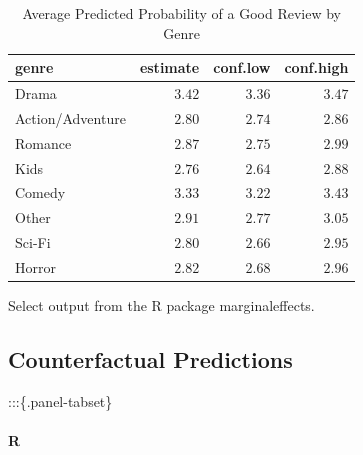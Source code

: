 \documentclass[
  letterpaper,
]{krantz}
\let\oldparagraph\paragraph
\renewcommand{\paragraph}[1]{\oldparagraph{#1}\mbox{}}
\begin{document}
\begin{longtable}{lrrr}

\caption{\label{tbl-marginal-means-genre}Average Predicted Probability
of a Good Review by Genre}

\tabularnewline

\toprule
genre & estimate & conf.low & conf.high \\ 
\midrule\addlinespace[2.5pt]
Drama & \textcolor[HTML]{404040}{$3.42$} & \textcolor[HTML]{404040}{$3.36$} & \textcolor[HTML]{404040}{$3.47$} \\ 
Action/Adventure & \textcolor[HTML]{404040}{$2.80$} & \textcolor[HTML]{404040}{$2.74$} & \textcolor[HTML]{404040}{$2.86$} \\ 
Romance & \textcolor[HTML]{404040}{$2.87$} & \textcolor[HTML]{404040}{$2.75$} & \textcolor[HTML]{404040}{$2.99$} \\ 
Kids & \textcolor[HTML]{404040}{$2.76$} & \textcolor[HTML]{404040}{$2.64$} & \textcolor[HTML]{404040}{$2.88$} \\ 
Comedy & \textcolor[HTML]{404040}{$3.33$} & \textcolor[HTML]{404040}{$3.22$} & \textcolor[HTML]{404040}{$3.43$} \\ 
Other & \textcolor[HTML]{404040}{$2.91$} & \textcolor[HTML]{404040}{$2.77$} & \textcolor[HTML]{404040}{$3.05$} \\ 
Sci-Fi & \textcolor[HTML]{404040}{$2.80$} & \textcolor[HTML]{404040}{$2.66$} & \textcolor[HTML]{404040}{$2.95$} \\ 
Horror & \textcolor[HTML]{404040}{$2.82$} & \textcolor[HTML]{404040}{$2.68$} & \textcolor[HTML]{404040}{$2.96$} \\ 
\bottomrule

\end{longtable}

\begin{minipage}{\linewidth}
Select output from the R package marginaleffects.\\
\end{minipage}

\subsection{Counterfactual
Predictions}\label{counterfactual-predictions}

:::\{.panel-tabset\}

\paragraph{R}\label{r-32}
\end{document}
